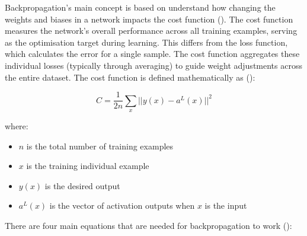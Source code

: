 \noindent Backpropagation's main concept is based on understand how changing the weights and biases in a network impacts the cost function (\cite{nielsen2015neural}). The cost function measures the network's overall performance across all training examples, serving as the optimisation target during learning. This differs from the loss function, which calculates the error for a single sample. The cost function aggregates these individual losses (typically through averaging) to guide weight adjustments across the entire dataset. The cost function is defined mathematically as (\cite{nielsen2015neural}):

\begin{equation}\label{alg:cost_function}
     C = \frac{1}{2n}\sum_{x} ||y(x)-a^L(x)||^2
\end{equation}

where:
\begin{itemize}
    \item $n$ is the total number of training examples
    \item $x$ is the training individual example
    \item $y(x)$ is the desired output
    \item $a^L(x)$ is the vector of activation outputs when $x$ is the input
\end{itemize}

\noindent There are four main equations that are needed for backpropagation to work (\cite{nielsen2015neural}):


